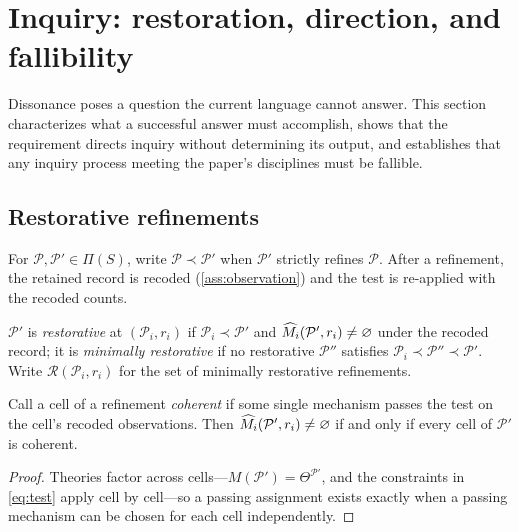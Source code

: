 \section{Inquiry: restoration, direction, and fallibility}
\label{sec:inquiry}

Dissonance poses a question the current language cannot answer.  This
section characterizes what a successful answer must accomplish, shows that
the requirement directs inquiry without determining its output, and
establishes that any inquiry process meeting the paper's disciplines must be
fallible.

\subsection{Restorative refinements}

For $\mathcal P,\mathcal P'\in\Pi(S)$, write $\mathcal P\prec\mathcal P'$
when $\mathcal P'$ strictly refines $\mathcal P$.  After a refinement, the
retained record is recoded (\cref{ass:observation}) and the test is
re-applied with the recoded counts.

\begin{definition}
\label{def:restorative}
$\mathcal P'$ is \emph{restorative} at $(\mathcal P_i,r_i)$ if
$\mathcal P_i\prec\mathcal P'$ and
$\widehat M_i(\mathcal P',r_i)\neq\varnothing$ under the recoded record; it
is \emph{minimally restorative} if no restorative $\mathcal P''$ satisfies
$\mathcal P_i\prec\mathcal P''\prec\mathcal P'$.  Write
$\mathcal R(\mathcal P_i,r_i)$ for the set of minimally restorative
refinements.
\end{definition}

\begin{proposition}
\label{prop:coherence}
Call a cell of a refinement \emph{coherent} if some single mechanism passes
the test on the cell's recoded observations.  Then
$\widehat M_i(\mathcal P',r_i)\neq\varnothing$ if and only if every cell of
$\mathcal P'$ is coherent.
\end{proposition}

\begin{proof}
Theories factor across cells---$M(\mathcal P')=\Theta^{\mathcal P'}$, and the
constraints in \cref{eq:test} apply cell by cell---so a passing assignment
exists exactly when a passing mechanism can be chosen for each cell
independently.
\end{proof}

